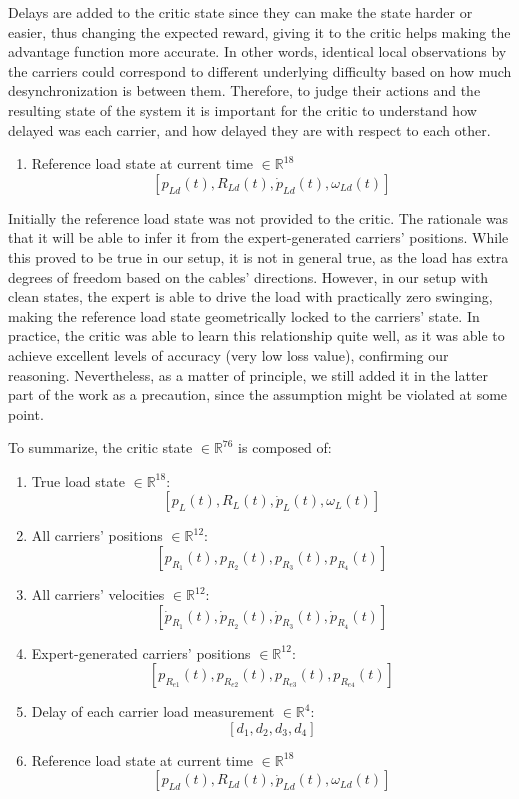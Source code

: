 Delays are added to the critic state since they can make the state harder or
easier, thus changing the expected reward, giving it to the critic
helps making the advantage function more accurate. In other words,
identical local observations by the carriers could correspond to
different underlying difficulty based on how much desynchronization is
between them. Therefore, to judge their actions and the resulting state
of the system it is important for the critic to understand how delayed
was each carrier, and how delayed they are with respect to each other.

\begin{enumerate}[resume]
  \item Reference load state at current time $\in \mathbb{R}^{18}$
  \[
    [p_{Ld}(t), R_{Ld}(t), \dot{p}_{Ld}(t), \omega_{Ld}(t)]
  \]
\end{enumerate}

Initially the reference load state was not provided to the critic. The
rationale was that it will be able to infer it from the expert-generated
carriers’ positions. While this proved to be true in our setup, it is
not in general true, as the load has extra degrees of freedom based on
the cables’ directions. However, in our setup with clean states, the
expert is able to drive the load with practically zero swinging, making
the reference load state geometrically locked to the carriers’ state. In
practice, the critic was able to learn this relationship quite well, as
it was able to achieve excellent levels of accuracy (very low loss
value), confirming our reasoning. Nevertheless, as a matter of
principle, we still added it in the latter part of the work as a
precaution, since the assumption might be violated at some point.

To summarize, the critic state $\in \mathbb{R}^{76}$ is composed of:

\begin{enumerate}
  \item True load state $\in \mathbb{R}^{18}$:
  \[
    [p_L(t), R_L(t), \dot{p}_L(t), \omega_L(t)]
  \]
  \item All carriers’ positions $\in \mathbb{R}^{12}$:
  \[
    [p_{R_1}(t), p_{R_2}(t), p_{R_3}(t), p_{R_4}(t)]
  \]
  \item All carriers’ velocities $\in \mathbb{R}^{12}$:
  \[
    [\dot{p}_{R_1}(t), \dot{p}_{R_2}(t), \dot{p}_{R_3}(t), \dot{p}_{R_4}(t)]
  \]
  \item Expert-generated carriers’ positions $\in \mathbb{R}^{12}$:
  \[
    [p_{R_{e1}}(t), p_{R_{e2}}(t), p_{R_{e3}}(t), p_{R_{e4}}(t)]
  \]
  \item Delay of each carrier load measurement $\in \mathbb{R}^4$:
  \[
    [d_1, d_2, d_3, d_4]
  \]
  \item Reference load state at current time $\in \mathbb{R}^{18}$
  \[
    [p_{Ld}(t), R_{Ld}(t), \dot{p}_{Ld}(t), \omega_{Ld}(t)]
  \]
\end{enumerate}

